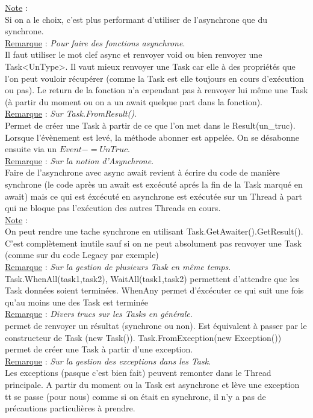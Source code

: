 \documentclass[a4paper,12pt,twoside]{article}
\newcommand{\incode}[1]{{\footnotesize\ttfamily #1}} %
\newcommand{\rem}[2]{\noindent\underline{Remarque} : \textit{#1}.\\ \indent #2}
\newcommand{\note}[1]{\noindent\underline{Note} : \\ \indent #1}
\begin{document}
\note{Si on a le choix, c'est plus performant d'utiliser de l'asynchrone que du synchrone.}\\

\rem{Pour faire des fonctions asynchrone}{Il faut utiliser le mot clef \incode{async} et renvoyer void ou bien renvoyer une \incode{Task<UnType>}. Il vaut mieux renvoyer une Task car elle à des propriétés que l'on peut vouloir récupérer (comme la Task est elle toujours en cours d'exécution ou pas). Le \incode{return} de la fonction n'a cependant pas à renvoyer lui même une \incode{Task} (à partir du moment ou on a un \incode{await} quelque part dans la fonction).}\\

\rem{Sur \incode{Task.FromResult()}}{Permet de créer une \incode{Task} à partir de ce que l'on met dans le \incode{Result(un\_truc)}. Lorsque l'évènement est levé, la méthode abonner est appelée. On se désabonne ensuite via un $Event -= UnTruc$.}\\

\rem{Sur la notion d'Asynchrone}{Faire de l'asynchrone avec \incode{async await} revient à écrire du code de manière synchrone (le code après un await est excécuté aprés la fin de la Task marqué en await) mais ce qui est éxcécuté en asynchrone est exécutée sur un Thread à part qui ne bloque pas l'exécution des autres Threads en cours.}\\

\note{On peut rendre une tache synchrone en utilisant \incode{Task.GetAwaiter().GetResult()}. C'est complètement inutile sauf si on ne peut absolument pas renvoyer une \incode{Task} (comme sur du code Legacy par exemple)}\\

\rem{Sur la gestion de plusieurs Task en même temps}{Task.WhenAll(task1,task2), WaitAll(task1,task2) permettent d'attendre que les Task données soient terminées. \incode{WhenAny} permet d'éxcécuter ce qui suit une fois qu'au moins une des Task est terminée}\\

\rem{Divers trucs sur les Tasks en générale}{\incode{Task.FromResult(résultat)} permet de renvoyer un résultat (synchrone ou non). Est équivalent à passer par le constructeur de Task (\incode{new Task()}). \incode{Task.FromException(new Exception())} permet de créer une Task à partir d'une exception.}\\

\rem{Sur la gestion des exceptions dans les Task}{Les exceptions (pasque c'est bien fait) peuvent remonter dans le Thread principale. A partir du moment ou la Task est asynchrone et lève une exception tt se passe (pour nous) comme si on était en synchrone, il n'y a pas de précautions particulières à prendre.}\\
\end{document}
